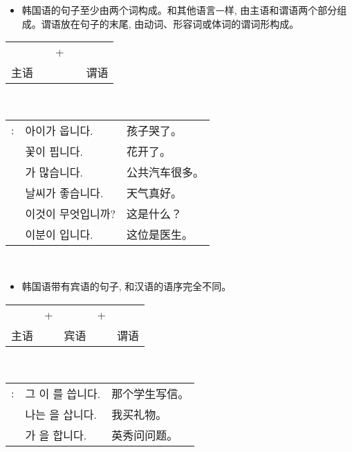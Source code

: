 \begin{grammar}
    \begin{grammarsect}[句子结构]
    \begin{itemize}
        \item 韩国语的句子至少由两个词构成。和其他语言ᅳ样, 由主语和谓语两个部分组成。谓语放在句子的末尾, 由动词、形容词或体词的谓词形构成。
    \end{itemize}
    \begin{center}
    \begin{tabular}{lllll}
        \kr \ruby{主語}{주어}&\qquad&+&\qquad&\kr \ruby{敘述語}{서술어}\\
        主语&\qquad&&\qquad&谓语
    \end{tabular}\\
    \end{center}
    \begin{tabular}{lll}
        \kr \ruby{例}{예}: &\kr 아이가 웁니다.&孩子哭了。\\
        &\kr 꽃이 핍니다.&花开了。\\
        &\kr \ruby{버스}{bus}가 많습니다.&公共汽车很多。\\
        &\kr 날씨가 좋습니다.&天气真好。\\
        &\kr 이것이 무엇입니까?&这是什么？\\
        &\kr 이분이 \ruby{醫師}{의사}입니다.&这位是医生。
    \end{tabular}\\
    \end{grammarsect}
    \begin{itemize}
        \item 韩国语带有宾语的句子, 和汉语的语序完全不同。
    \end{itemize}
    \begin{center}
    \begin{tabular}{lllll}
        \kr \ruby{主語}{주어}&+&\kr \ruby{目的語}{목적어}&+&\kr \ruby{敘述語}{서술어}\\
        主语&&宾语&&谓语
    \end{tabular}\\
    \end{center}
    \begin{tabular}{lll}
        \kr \ruby{例}{예}: &\kr 그 \ruby{學生}{학생}이 \ruby{便紙}{편지}를 씁니다.&那个学生写信。\\
        &\kr 나는 \ruby{膳物}{선물}을 삽니다.&我买礼物。\\
        &\kr \ruby{英秀}{영수}가 \ruby{質問}{질문}을 합니다.&英秀问问题。
    \end{tabular}\\
\end{grammar}
